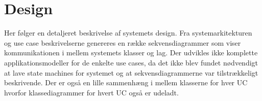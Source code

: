 \chapter{Design}
Her følger en detaljeret beskrivelse af systemets design. Fra systemarkitekturen og use case beskrivelserne genereres en række sekvensdiagrammer som viser kommunikationen i mellem systemets klasser og lag. Der udvikles ikke komplette applikationsmodeller for de enkelte use cases, da det ikke blev fundet nødvendigt at lave state machines for systemet og at sekvensdiagrammerne var tilstrækkeligt beskrivende. Der er også en lille sammenhæng i mellem klasserne for hver UC hvorfor klassediagrammer for hvert UC også er udeladt.





